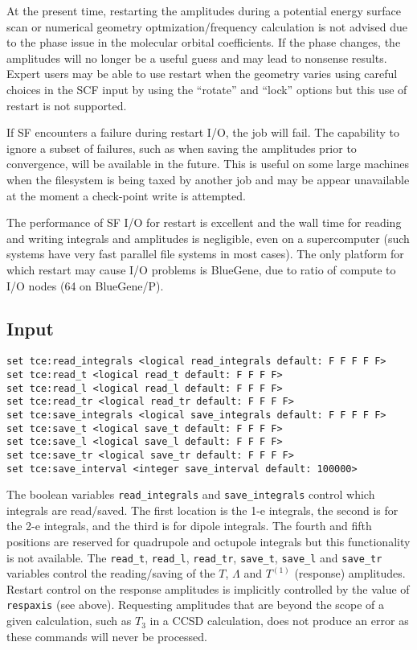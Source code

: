 At the present time, restarting the amplitudes during a potential energy surface scan or numerical geometry optmization/frequency calculation is not advised due to the phase issue in the molecular orbital coefficients.  If the phase changes, the amplitudes will no longer be a useful guess and may lead to nonsense results.  Expert users may be able to use restart when the geometry varies using careful choices in the SCF input by using the ``rotate'' and ``lock'' options but this use of restart is not supported.

If SF encounters a failure during restart I/O, the job will fail.  The capability to ignore a subset of failures, such as when saving the amplitudes prior to convergence, will be available in the future.  This is useful on some large machines when the filesystem is being taxed by another job and may be appear unavailable at the moment a check-point write is attempted.  

The performance of SF I/O for restart is excellent and the wall time for reading and writing integrals and amplitudes is negligible, even on a supercomputer (such systems have very fast parallel file systems in most cases).  The only platform for which restart may cause I/O problems is BlueGene, due to ratio of compute to I/O nodes (64 on BlueGene/P).

\subsection{Input}

\begin{verbatim}
set tce:read_integrals <logical read_integrals default: F F F F F>
set tce:read_t <logical read_t default: F F F F>
set tce:read_l <logical read_l default: F F F F>
set tce:read_tr <logical read_tr default: F F F F>
set tce:save_integrals <logical save_integrals default: F F F F F>
set tce:save_t <logical save_t default: F F F F>
set tce:save_l <logical save_l default: F F F F>
set tce:save_tr <logical save_tr default: F F F F>
set tce:save_interval <integer save_interval default: 100000>
\end{verbatim}

The boolean variables \verb+read_integrals+ and \verb+save_integrals+ control which integrals are read/saved.  The first location is the 1-e integrals, the second is for the 2-e integrals, and the third is for dipole integrals.  The fourth and fifth positions are reserved for quadrupole and octupole integrals but this functionality is not available.  The \verb+read_t+, \verb+read_l+, \verb+read_tr+, \verb+save_t+, \verb+save_l+ and \verb+save_tr+ variables control the reading/saving of the $T$, $\Lambda$ and $T^{(1)}$ (response) amplitudes.  Restart control on the response amplitudes is implicitly controlled by the value of \verb+respaxis+ (see above).  Requesting amplitudes that are beyond the scope of a given calculation, such as $T_3$ in a CCSD calculation, does not produce an error as these commands will never be processed.

